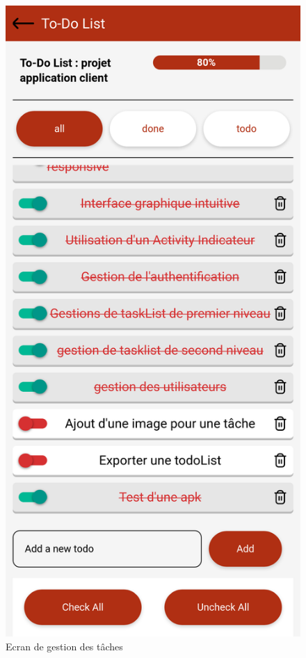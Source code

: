 \documentclass[12pt]{article}
\begin{document}
        \begin{figure}[H]
            \centering
            \includegraphics[scale=0.2]{images/tasks}
            \caption{Ecran de gestion des tâches}
            \label{fig:gestion-taches}
        \end{figure}
\end{document}
